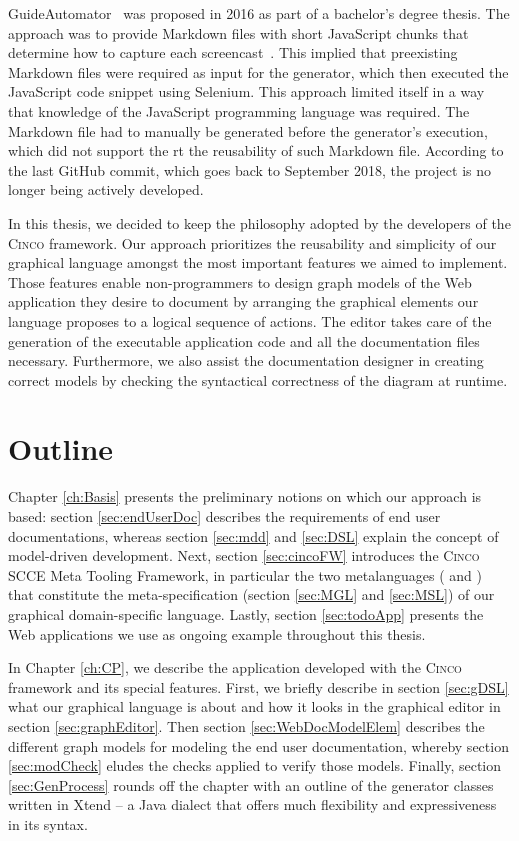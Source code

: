 GuideAutomator~\cite{oliveira2016guideautomator} was proposed in 2016 as part of a bachelor's degree thesis. The approach was to provide Markdown files with short JavaScript chunks that determine how to capture each screencast~\cite{guidAutomatorGitHub}. This implied that preexisting Markdown files were required as input for the generator, which then executed the JavaScript code snippet using Selenium. This approach limited itself in a way that knowledge of the JavaScript programming language was required. The Markdown file had to manually be generated before the generator's execution, which did not support the rt the reusability of such Markdown file. According to the last GitHub commit, which goes back to September 2018, the project is no longer being actively developed.

In this thesis, we decided to keep the philosophy adopted by the developers of the \textsc{Cinco} framework. Our approach prioritizes the reusability and simplicity of our graphical language amongst the most important features we aimed to implement. Those features enable non-programmers to design graph models of the Web application they desire to document by arranging the graphical elements our language proposes to a logical sequence of actions. The editor takes care of the generation of the executable application code and all the documentation files necessary. Furthermore, we also assist the documentation designer in creating correct models by checking the syntactical correctness of the diagram at runtime.

\section{Outline}\label{sec:outline}

Chapter \ref{ch:Basis} presents the preliminary notions on which our approach is based: section \ref{sec:endUserDoc} describes the requirements of end user documentations, whereas section \ref{sec:mdd} and \ref{sec:DSL} explain the concept of model-driven development. Next, section \ref{sec:cincoFW} introduces the \textsc{Cinco} SCCE Meta Tooling Framework, in particular the two metalanguages ( and ) that constitute the meta-specification (section \ref{sec:MGL} and \ref{sec:MSL}) of our graphical domain-specific language. Lastly, section \ref{sec:todoApp} presents the Web applications we use as ongoing example throughout this thesis.

In Chapter \ref{ch:CP}, we describe the application developed with the \textsc{Cinco} framework and its special features. First, we briefly describe in section \ref{sec:gDSL} what our graphical language is about and how it looks in the graphical editor in section \ref{sec:graphEditor}. Then section \ref{sec:WebDocModelElem} describes the different graph models for modeling the end user documentation, whereby section \ref{sec:modCheck} eludes the checks applied to verify those models. Finally, section \ref{sec:GenProcess} rounds off the chapter with an outline of the generator classes written in Xtend -- a Java dialect that offers much flexibility and expressiveness in its syntax.

